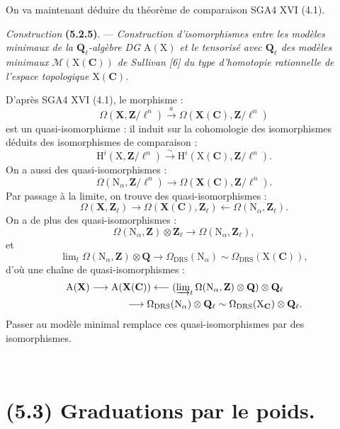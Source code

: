 \documentclass[11pt,leqno]{article}
\newcommand{\Page}[1]{\ifvmode\noindent\else\unskip\ \fi{\footnotesize\textcolor{gray}{[p.\,#1]}}\ \ignorespaces}
\begin{document}
On va maintenant déduire du théorème de comparaison SGA4 XVI (4.1).

\textit{Construction} \textbf{(5.2.5)}. — \textit{Construction d’isomorphismes entre les modèles minimaux de la \(\mathbf{Q}_{\ell}\)-algèbre \textup{DG} \(\mathrm{A}(\mathrm{X})\) et le tensorisé avec \(\mathbf{Q}_{\ell}\) des modèles minimaux \(\mathcal{M}(\mathrm{X}(\mathbf{C}))\) de Sullivan \textup{[6]} du type d’homotopie rationnelle de l’espace topologique \(\mathrm{X}(\mathbf{C})\).}

D’après SGA4 XVI (4.1), le morphisme :
\[
\Omega(\mathbf{X},\mathbf{Z}/\ell^n)
\xrightarrow{a}
\Omega(\mathbf{X}(\mathbf{C}),\mathbf{Z}/\ell^n)
\]
est un quasi-isomorphisme : il induit sur la cohomologie des isomorphismes déduits des isomorphismes de comparaison :
\[
\mathrm{H}^i(\mathrm{X},\mathbf{Z}/\ell^n)
\xrightarrow{\sim}
\mathrm{H}^i(\mathrm{X}(\mathbf{C}),\mathbf{Z}/\ell^n).
\]
On a aussi des quasi-isomorphismes :
\[
\Omega(\mathrm{N}_{\alpha},\mathbf{Z}/\ell^n)
\longrightarrow
\Omega(\mathbf{X}(\mathbf{C}),\mathbf{Z}/\ell^n).
\]
Par passage à la limite, on trouve des quasi-isomorphismes :
\[
\Omega(\mathbf{X},\mathbf{Z}_{\ell})
\longrightarrow
\Omega(\mathbf{X}(\mathbf{C}),\mathbf{Z}_{\ell})
\longleftarrow
\Omega(\mathrm{N}_{\alpha},\mathbf{Z}_{\ell}).
\]
On a de plus des quasi-isomorphismes :
\[
\Omega(\mathrm{N}_{\alpha},\mathbf{Z})\otimes\mathbf{Z}_{\ell}
\longrightarrow
\Omega(\mathrm{N}_{\alpha},\mathbf{Z}_{\ell}),
\]
et
\[
\lim\nolimits_t\Omega(\mathrm{N}_{\alpha},\mathbf{Z})\otimes\mathbf{Q}
\longrightarrow
\Omega_{\mathrm{DRS}}(\mathrm{N}_{\alpha})
\sim
\Omega_{\mathrm{DRS}}(\mathrm{X}(\mathbf{C})),
\]
d’où une chaîne de quasi-isomorphismes :
\[
\begin{aligned}
&\mathrm{A}(\mathbf{X})
\longrightarrow
\mathrm{A}(\mathbf{X}(\mathbf{C}))
\longleftarrow
(\varinjlim\nolimits_t\Omega(\mathrm{N}_{\alpha},\mathbf{Z})\otimes\mathbf{Q})
\otimes\mathbf{Q}_{\ell}\\
&\qquad\qquad\qquad
\longrightarrow
\Omega_{\mathrm{DRS}}(\mathrm{N}_{\alpha})\otimes\mathbf{Q}_{\ell}
\sim
\Omega_{\mathrm{DRS}}(\mathrm{X}_{\mathbf{C}})\otimes\mathbf{Q}_{\ell}.
\end{aligned}
\]
Passer au modèle minimal remplace ces quasi-isomorphismes par des isomorphismes.

\Page{240}
\section*{(5.3) Graduations par le poids.}
\end{document}

